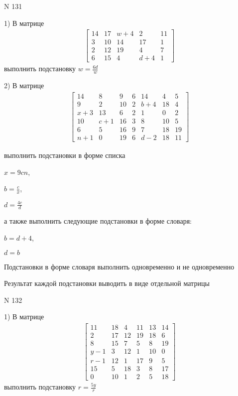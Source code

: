 \documentclass[11pt]{report}
\begin{document}
\newpage
N 131


    1) В матрице
\begin{align*}
\left[\begin{matrix}14 & 17 & w + 4 & 2 & 11\\3 & 10 & 14 & 17 & 1\\2 & 12 & 19 & 4 & 7\\6 & 15 & 4 & d + 4 & 1\end{matrix}\right]
\end{align*}
выполнить подстановку $w=\frac{6 d}{w}$


    2) В матрице
\begin{align*}
\left[\begin{matrix}14 & 8 & 9 & 6 & 14 & 4 & 5\\9 & 2 & 10 & 2 & b + 4 & 18 & 4\\x + 3 & 13 & 6 & 2 & 1 & 0 & 2\\10 & c + 1 & 16 & 3 & 8 & 10 & 5\\6 & 5 & 16 & 9 & 7 & 18 & 19\\n + 1 & 0 & 19 & 6 & d - 2 & 18 & 11\end{matrix}\right]
\end{align*}

выполнить подстановки в форме списка

$x=9 c n$,

$b=\frac{c}{x}$,

$d=\frac{4 c}{d}$

а также выполнить следующие подстановки в форме словаря:

$b=d + 4$,

$d=b$


    Подстановки в форме словаря выполнить одновременно и не одновременно


    Результат каждой подстановки выводить в виде отдельной матрицы

\newpage
N 132


    1) В матрице
\begin{align*}
\left[\begin{matrix}11 & 18 & 4 & 11 & 13 & 14\\2 & 17 & 12 & 19 & 18 & 6\\8 & 15 & 7 & 5 & 8 & 19\\y - 1 & 3 & 12 & 1 & 10 & 0\\r - 1 & 12 & 1 & 17 & 9 & 5\\15 & 5 & 18 & 3 & 8 & 17\\0 & 10 & 1 & 2 & 5 & 18\end{matrix}\right]
\end{align*}
выполнить подстановку $r=\frac{5 y}{r}$
\end{document}
